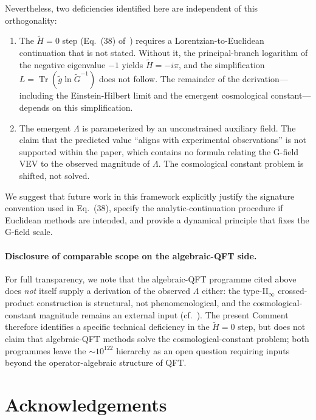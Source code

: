 \documentclass[aps,prd,twocolumn,preprintnumbers,superscriptaddress]{revtex4-2}
\newcommand{\tg}{\tilde{g}}
\newcommand{\tG}{\tilde{G}}
\newcommand{\tr}{\operatorname{Tr}}
\newcommand{\iunit}{i}
\begin{document}
Nevertheless, two deficiencies identified here are independent of this
orthogonality:
\begin{enumerate}
  \item The $\tilde{H}=0$ step (Eq.~(38) of~\cite{Bianconi2025}) requires
    a Lorentzian-to-Euclidean continuation that is not stated.  Without it,
    the principal-branch logarithm of the negative eigenvalue $-1$ yields
    $\tilde{H}=-\iunit\pi$, and the simplification
    $L = \tr(\tg\ln\tG^{-1})$ does not follow.  The remainder of the
    derivation---including the Einstein-Hilbert limit and the emergent
    cosmological constant---depends on this simplification.
  \item The emergent $\Lambda$ is parameterized by an unconstrained
    auxiliary field.  The claim that the predicted value ``aligns with
    experimental observations'' is not supported within the paper, which
    contains no formula relating the G-field VEV to the observed magnitude
    of $\Lambda$.  The cosmological constant problem is shifted, not solved.
\end{enumerate}

We suggest that future work in this framework explicitly justify the
signature convention used in Eq.~(38), specify the analytic-continuation
procedure if Euclidean methods are intended, and provide a dynamical
principle that fixes the G-field scale.

\paragraph{Disclosure of comparable scope on the algebraic-QFT side.}
For full transparency, we note that the algebraic-QFT programme cited
above does \emph{not} itself supply a derivation of the observed
$\Lambda$ either: the type-II$_\infty$ crossed-product construction is
structural, not phenomenological, and the cosmological-constant magnitude
remains an external input (cf.~\cite{Witten2022,CLPW2023}). The present
Comment therefore identifies a specific technical deficiency in the
$\tilde H=0$ step, but does not claim that algebraic-QFT methods solve
the cosmological-constant problem; both programmes leave the
$\sim\!10^{122}$ hierarchy as an open question requiring inputs beyond
the operator-algebraic structure of QFT.

\section*{Acknowledgements}
\end{document}
